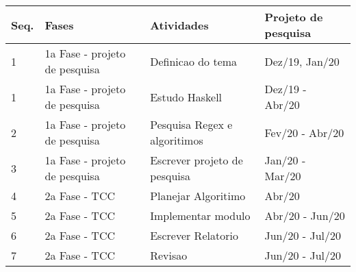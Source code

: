 \begin{center}
\begin{tabular}{llll}
\hline
Seq. & Fases & Atividades & Projeto de pesquisa\\
\hline
1 & 1a Fase - projeto de pesquisa & Definicao do tema & Dez/19, Jan/20\\
1 & 1a Fase - projeto de pesquisa & Estudo Haskell & Dez/19 - Abr/20\\
2 & 1a Fase - projeto de pesquisa & Pesquisa Regex e algoritimos & Fev/20 - Abr/20\\
3 & 1a Fase - projeto de pesquisa & Escrever projeto de pesquisa & Jan/20 - Mar/20\\
4 & 2a Fase - TCC & Planejar Algoritimo & Abr/20\\
5 & 2a Fase - TCC & Implementar modulo & Abr/20 - Jun/20\\
6 & 2a Fase - TCC & Escrever Relatorio & Jun/20 - Jul/20\\
7 & 2a Fase - TCC & Revisao & Jun/20 - Jul/20\\
\hline
\end{tabular}
\end{center}
